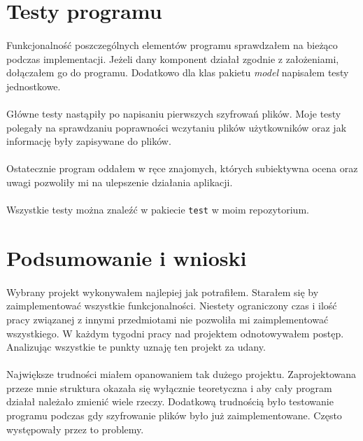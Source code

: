 \documentclass[a4paper]{article}
\newcommand{\prog}{\texttt}
\begin{document}
\section{Testy programu}
\paragraph{}
Funkcjonalność poszczególnych elementów programu sprawdzałem na bieżąco podczas implementacji.
Jeżeli dany komponent działał zgodnie z założeniami, dołączałem go do programu.
Dodatkowo dla klas pakietu \textit{model} napisałem testy jednostkowe.
\paragraph{}
Główne testy nastąpiły po napisaniu pierwszych szyfrowań plików. Moje testy polegały na sprawdzaniu poprawności wczytaniu plików użytkowników oraz jak informację były zapisywane do plików.
\paragraph{}
Ostatecznie program oddałem w ręce znajomych, których subiektywna ocena oraz uwagi pozwoliły mi na ulepszenie działania aplikacji.
\paragraph{}
Wszystkie testy można znaleźć w pakiecie \prog{test} w moim repozytorium.

\section{Podsumowanie i wnioski}
\paragraph{}
Wybrany projekt wykonywałem najlepiej jak potrafiłem. Starałem się by zaimplementować wszystkie funkcjonalności. Niestety ograniczony czas i ilość pracy związanej z innymi przedmiotami nie pozwoliła mi zaimplementować wszystkiego. W każdym tygodni pracy nad projektem odnotowywałem postęp. Analizując wszystkie te punkty uznaję ten projekt za udany.
\paragraph{}
Największe trudności miałem opanowaniem tak dużego projektu. Zaprojektowana przeze mnie struktura okazała się wyłącznie teoretyczna i aby cały program działał należało zmienić wiele rzeczy. Dodatkową trudnością było testowanie programu podczas gdy szyfrowanie plików było już zaimplementowane. Często występowały przez to problemy.
\end{document}
